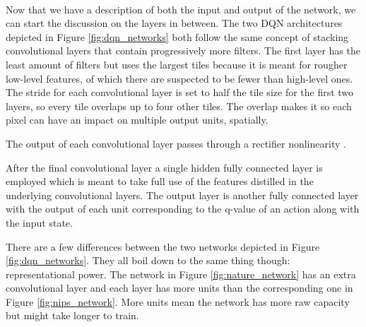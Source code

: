 \paragraph{}
Now that we have a description
of both the input and output of the network,
we can start the discussion on the layers in between.
The two DQN architectures depicted in Figure \ref{fig:dqn_networks}
both follow the same concept
of stacking convolutional layers that
contain progressively more filters.
The first layer has the least amount of filters but uses the largest tiles
because it is meant for rougher low-level features,
of which there are suspected to be fewer than high-level ones.
The stride for each convolutional layer is set
to half the tile size for the first two layers,
so every tile overlaps up to four other tiles.
The overlap makes it so each pixel can have an impact
on multiple output units, spatially.

The output of each convolutional layer passes through a rectifier
nonlinearity \parencite{Nair2010}.

After the final convolutional layer
a single hidden fully connected layer is employed
which is meant to take full use of the features distilled
in the underlying convolutional layers.
The output layer is another fully connected layer
with the output of each unit corresponding to the q-value of an action
along with the input state.

There are a few differences between the two networks
depicted in Figure \ref{fig:dqn_networks}.
They all boil down to the same thing though:
representational power.
The network in Figure \ref{fig:nature_network}
has an extra convolutional layer
and each layer has more units than the corresponding one
in Figure \ref{fig:nips_network}.
More units mean the network has more raw capacity
but might take longer to train.

